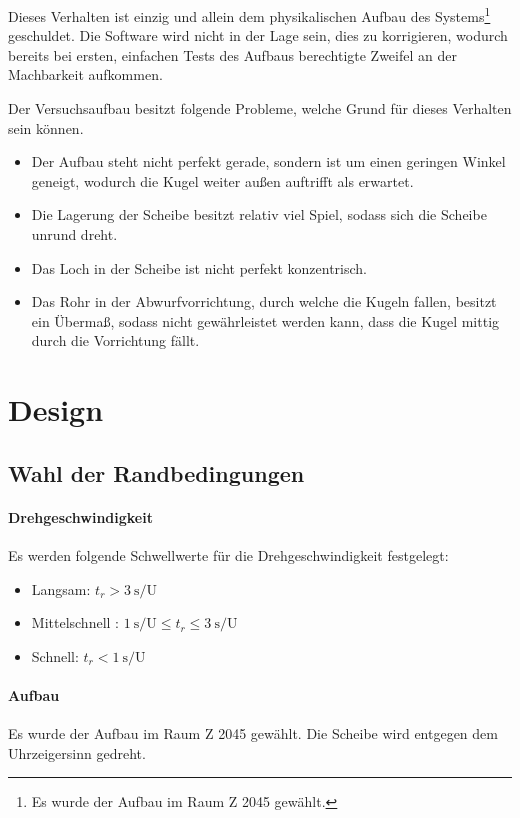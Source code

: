\documentclass{kis}
\begin{document}
Dieses Verhalten ist einzig und allein dem physikalischen Aufbau des Systems\footnote{Es wurde der Aufbau im Raum Z 2045 gewählt.} geschuldet. Die Software wird nicht in der Lage sein, dies zu korrigieren, wodurch bereits bei ersten, einfachen Tests des Aufbaus berechtigte Zweifel an der Machbarkeit aufkommen.

Der Versuchsaufbau besitzt folgende Probleme, welche Grund für dieses Verhalten sein können.
\begin{itemize}
	\item Der Aufbau steht nicht perfekt gerade, sondern ist um einen geringen Winkel geneigt, wodurch die Kugel weiter außen auftrifft als erwartet.
	\item Die Lagerung der Scheibe besitzt relativ viel Spiel, sodass sich die Scheibe unrund dreht.
	\item Das Loch in der Scheibe ist nicht perfekt konzentrisch.
	\item Das Rohr in der Abwurfvorrichtung, durch welche die Kugeln fallen, besitzt ein Übermaß, sodass nicht gewährleistet werden kann, dass die Kugel mittig durch die Vorrichtung fällt.
\end{itemize}

\section{Design}
\subsection{Wahl der Randbedingungen}
\paragraph{Drehgeschwindigkeit}
Es werden folgende Schwellwerte für die Drehgeschwindigkeit festgelegt:
\begin{itemize}
	\item Langsam: $t_r>3~\text{s/U}$
	\item Mittelschnell : $1~\text{s/U}\leq t_r\leq 3~\text{s/U}$
	\item Schnell: $t_r<1~\text{s/U}$
\end{itemize}

\paragraph{Aufbau}
Es wurde der Aufbau im Raum Z 2045 gewählt. Die Scheibe wird entgegen dem Uhrzeigersinn gedreht.
\end{document}
